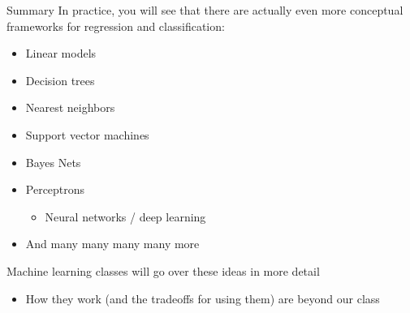 \documentclass[aspectratio=169]{../latex_main/tntbeamer}  %
\begin{document}
	\begin{frame}{Summary}
	   In practice, you will see that there are actually even more conceptual frameworks for regression and classification:
	    \begin{itemize}
	        \item Linear models
	        \item Decision trees
	        \item Nearest neighbors
	        \item Support vector machines
	        \item Bayes Nets
	        \item Perceptrons
	        \begin{itemize}
	            \item Neural networks / deep learning
	        \end{itemize}
	        \item And many many many many more
	    \end{itemize}
	    Machine learning classes will go over these ideas in more detail
	    \begin{itemize}
	        \item How they work (and the tradeoffs for using them) are beyond our class
	    \end{itemize}
	\end{frame}
\end{document}

